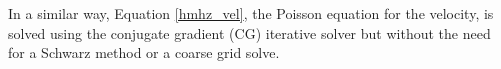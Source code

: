 \documentclass{sig-alternate}
\begin{document}
In a similar way, Equation \ref{hmhz_vel}, the Poisson equation for the velocity, is solved using the conjugate gradient (CG) iterative solver but without the need for a Schwarz method or a coarse grid solve.

\end{document}
